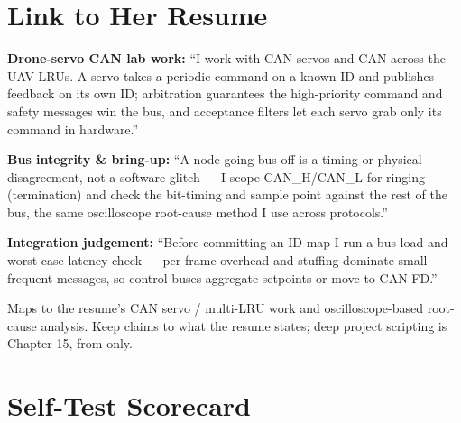 \section{Link to Her Resume}

\begin{resumelink}
\textbf{Drone-servo CAN lab work:} ``I work with CAN servos and CAN across the
UAV LRUs. A servo takes a periodic command on a known ID and publishes feedback
on its own ID; arbitration guarantees the high-priority command and safety
messages win the bus, and acceptance filters let each servo grab only its
command in hardware.''

\medskip
\textbf{Bus integrity \& bring-up:} ``A node going bus-off is a timing or
physical disagreement, not a software glitch --- I scope CAN\_H/CAN\_L for
ringing (termination) and check the bit-timing and sample point against the rest
of the bus, the same oscilloscope root-cause method I use across protocols.''

\medskip
\textbf{Integration judgement:} ``Before committing an ID map I run a bus-load
and worst-case-latency check --- per-frame overhead and stuffing dominate small
frequent messages, so control buses aggregate setpoints or move to CAN FD.''

\medskip
\small Maps to the resume's CAN servo / multi-LRU work and oscilloscope-based
root-cause analysis. Keep claims to what the resume states; deep project
scripting is Chapter 15, from  only.
\end{resumelink}

\section{Self-Test Scorecard}

